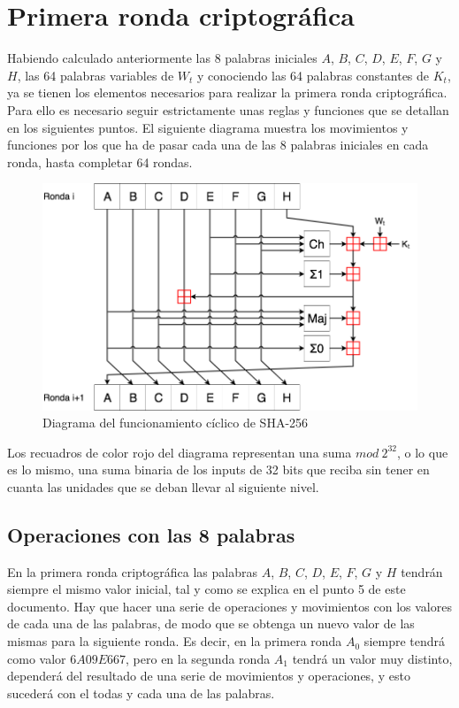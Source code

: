\documentclass{article}
\begin{document}
\section{Primera ronda criptográfica}
    Habiendo calculado anteriormente las 8 palabras iniciales $A$, $B$, $C$, $D$, $E$, $F$, $G$ y $H$, las 64 palabras variables de $W_{t}$ y conociendo las 64 palabras constantes de $K_{t}$, ya se tienen los elementos necesarios para realizar la primera ronda criptográfica. Para ello es necesario seguir estrictamente unas reglas y funciones que se detallan en los siguientes puntos. El siguiente diagrama muestra los movimientos y funciones por los que ha de pasar cada una de las 8 palabras iniciales en cada ronda, hasta completar 64 rondas.
        \begin{figure}[H]
        \centering
            \includegraphics[scale=0.33]{img/SHA-256-diagram.png}
            \caption{Diagrama del funcionamiento cíclico de SHA-256}
        \end{figure}
    
    Los recuadros de color rojo del diagrama representan una suma $mod \ 2^{32}$, o lo que es lo mismo, una suma binaria de los inputs de 32 bits que reciba sin tener en cuanta las unidades que se deban llevar al siguiente nivel.
    
    \subsection{Operaciones con las 8 palabras}
        En la primera ronda criptográfica las palabras $A$, $B$, $C$, $D$, $E$, $F$, $G$ y $H$ tendrán siempre el mismo valor inicial, tal y como se explica en el punto 5 de este documento. Hay que hacer una serie de operaciones y movimientos con los valores de cada una de las palabras, de modo que se obtenga un nuevo valor de las mismas para la siguiente ronda. Es decir, en la primera ronda $A_{0}$ siempre tendrá como valor $6A09E667$, pero en la segunda ronda $A_{1}$ tendrá un valor muy distinto, dependerá del resultado de una serie de movimientos y operaciones, y esto sucederá con el todas y cada una de las palabras.
        
\end{document}
